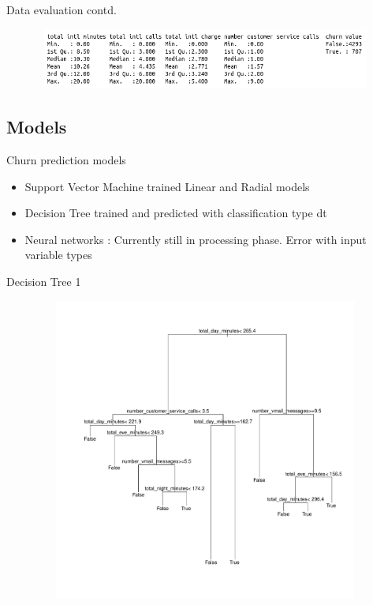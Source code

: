\documentclass{beamer}
\begin{document}
\begin{frame}{Data evaluation contd. }
	\begin{figure}
		\hspace*{-1cm}\includegraphics[width=13cm,height=2cm]{ppt_figures/data_summary_3}
	\end{figure}
\end{frame}

\subsection{Models}
\begin{frame}{Churn prediction models}
	\begin{itemize}
		\item Support Vector Machine trained Linear and Radial models
		\item Decision Tree trained and predicted with  classification type dt
		\item Neural networks : Currently still in processing phase. Error with input variable types
	\end{itemize}
\end{frame}
\begin{frame}{Decision Tree 1}
	\begin{figure}
		\hspace*{-1cm}
		\includegraphics[width=13cm,height=10cm]{ppt_figures/churnDecisionTree}
	\end{figure}
\end{frame}
\end{document}
